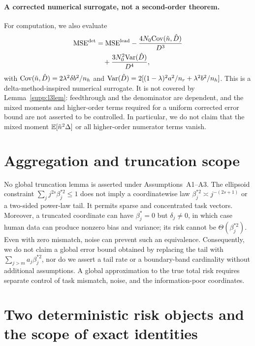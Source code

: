 \paragraph{A corrected numerical surrogate, not a second-order theorem.}
For computation, we also evaluate
\begin{align}
  \mathrm{MSE}^{\det}
  &= \mathrm{MSE}^{\mathrm{lead}}
  -\frac{4N_0\mathrm{Cov}(\tilde n,\hat D)}{D^3} \notag\\
  &\quad+\frac{3N_0^2\mathrm{Var}(\hat D)}{D^4},
  \label{supp:eq:msedet}
\end{align}
with $\mathrm{Cov}(\tilde n,\hat D)=2\lambda^2\delta b^2/n_h$ and $\mathrm{Var}(\hat D)=2[(1-\lambda)^2a^2/n_r+\lambda^2b^2/n_h]$. This is a delta-method-inspired numerical surrogate. It is not covered by Lemma~\ref{supp:l3lem}: feedthrough and the denominator are dependent, and the mixed moments and higher-order terms required for a uniform corrected error bound are not asserted to be controlled. In particular, we do not claim that the mixed moment $\mathbb{E}[\tilde n^2\Delta]$ or all higher-order numerator terms vanish.

\section{Aggregation and truncation scope}
\label{supp:l4}

No global truncation lemma is asserted under Assumptions~A1--A3. The ellipsoid constraint $\sum_j j^{2s}\beta_j^{*2}\le1$ does not imply a coordinatewise law $\beta_j^{*2}\asymp j^{-(2s+1)}$ or a two-sided power-law tail. It permits sparse and concentrated task vectors.
Moreover, a truncated coordinate can have $\beta_j^*=0$ but $\delta_j\ne0$, in which case human data can produce nonzero bias and variance; its risk cannot be $\Theta(\beta_j^{*2})$. Even with zero mismatch, noise can prevent such an equivalence.
Consequently, we do not claim a global error bound obtained by replacing the tail with $\sum_{j>m}a_j\beta_j^{*2}$, nor do we assert a tail rate or a boundary-band cardinality without additional assumptions. A global approximation to the true total risk requires separate control of task mismatch, noise, and the information-poor coordinates.

\section{Two deterministic risk objects and the scope of exact identities}
\label{supp:riskobjects}

